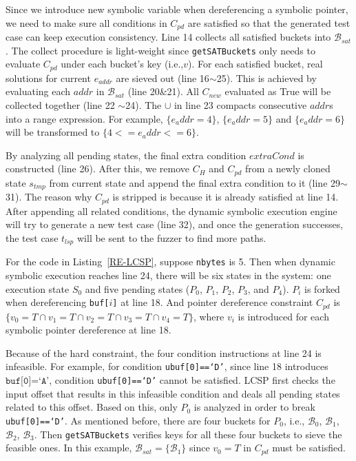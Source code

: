 Since we introduce new symbolic variable when dereferencing a symbolic pointer,
we need to make sure all conditions in $C_{pd}$ are satisfied so that the generated
test case can keep execution consistency.
Line 14 collects all satisfied buckets into $\mathcal{B}_{sat}$. The collect procedure
is light-weight since \texttt{getSATBuckets} only needs to evaluate $C_{pd}$
under each bucket's key (i.e.,$v$).
For each satisfied bucket, real solutions for current $e_{addr}$ are sieved out 
(line 16$\sim$25). This is achieved by evaluating each $addr$ in $\mathcal{B}_{sat}$
(line 20\&21). All $C_{new}$ evaluated as True will be collected together (line 22
$\sim$24). The $\cup$ in line 23 compacts consecutive $addr$s into a range expression.
For example, $\{e_addr=4\}$, $\{e_addr=5\}$ and $\{e_addr=6\}$ will be transformed to
$\{4<=e_addr<=6\}$.

By analyzing all pending states, the final extra condition $extraCond$ is constructed
(line 26).
After this, we remove $C_H$ and $C_{pd}$ from a newly cloned state $s_{tmp}$
from current state and append
the final extra condition to it (line 29$\sim$31). 
The reason why $C_{pd}$ is stripped is because it is already satisfied at line 14.
After appending all related conditions, the dynamic symbolic execution 
engine will try to generate a new test case (line 32), and once the 
generation successes, the test case $t_{lsp}$ will be sent to the 
fuzzer to find more paths.

For the code in Listing~\ref{RE-LCSP}, suppose \texttt{nbytes} is 5. 
Then when dynamic symbolic execution reaches line 24, there will be 
six states in the system: one execution state $S_0$ and five pending 
states ($P_0$, $P_1$, $P_2$, $P_3$, and $P_4$). $P_i$ is forked when 
dereferencing \texttt{buf[$i$]} at line 18. And pointer dereference
constraint $C_{pd}$ is $\{v_0=T\cap v_1=T\cap v_2=T\cap v_3=T\cap v_4=T\}$,
where $v_i$ is introduced for each symbolic pointer dereference at
line 18.

Because of the hard constraint, the four condition instructions at line 24
is infeasible. 
For example, for condition \texttt{ubuf[0]==`D'}, since line
18 introduces $\texttt{buf[0]=`A'}$, condition \texttt{ubuf[0]==`D'} cannot
be satisfied. LCSP first checks the input offset that results in this infeasible
condition and deals all pending states related to this offset. Based on this,
only $P_0$ is analyzed in order to break \texttt{ubuf[0]==`D'}. As mentioned before,
there are four buckets for $P_0$, i.e., $\mathcal{B}_0$, $\mathcal{B}_1$, $\mathcal{B}_2$,
$\mathcal{B}_3$. Then \texttt{getSATBuckets} verifies keys for all these four buckets 
to sieve the feasible ones. In this example, $\mathcal{B}_{sat}=\{\mathcal{B}_1\}$ since
$v_0=T$ in $C_{pd}$ must be satisfied. 

